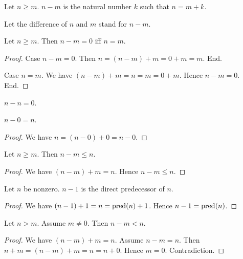 \documentclass[../../natural-numbers.ftl.tex]{subfiles}
\begin{document}
  \begin{forthel}
    \begin{definition}
      Let $n \geq m$.
      $n - m$ is the natural number $k$ such that $n = m + k$.
    \end{definition}

    Let the difference of $n$ and $m$ stand for $n - m$.

    \begin{proposition}\label{Arithmetic_02_07_297505}
      Let $n \geq m$.
      Then $n - m = 0$ iff $n = m$.
    \end{proposition}
    \begin{proof}
      Case $n - m = 0$.
        Then $n = (n - m) + m = 0 + m = m$.
      End.

      Case $n = m$.
        We have $(n - m) + m = n = m = 0 + m$.
        Hence $n - m = 0$.
      End.
    \end{proof}

    \begin{corollary}\label{Arithmetic_02_07_239083}
      $n - n = 0$.
    \end{corollary}

    \begin{proposition}\label{Arithmetic_02_07_151829}
      $n - 0 = n$.
    \end{proposition}
    \begin{proof}
      We have $n = (n - 0) + 0 = n - 0$.
    \end{proof}

    \begin{proposition}\label{Arithmetic_02_07_236650}
      Let $n \geq m$.
      Then $n - m \leq n$.
    \end{proposition}
    \begin{proof}
      We have $(n - m) + m = n$.
      Hence $n - m \leq n$.
    \end{proof}

    \begin{proposition}\label{Arithmetic_02_07_554898}
      Let $n$ be nonzero.
      $n - 1$ is the direct predecessor of $n$.
    \end{proposition}
    \begin{proof}
      We have $(n - 1) + 1 = n = \operatorname{pred}(n) + 1$.
      Hence $n - 1 = \operatorname{pred}(n)$.
    \end{proof}

    \begin{proposition}\label{Arithmetic_02_07_654395}
      Let $n > m$.
      Assume $m \neq 0$.
      Then $n - m < n$.
    \end{proposition}
    \begin{proof}
      We have $(n - m) + m = n$.
      Assume $n - m = n$.
      Then $n + m = (n - m) + m = n = n + 0$.
      Hence $m = 0$.
      Contradiction.
    \end{proof}


\end{forthel}
\end{document}
